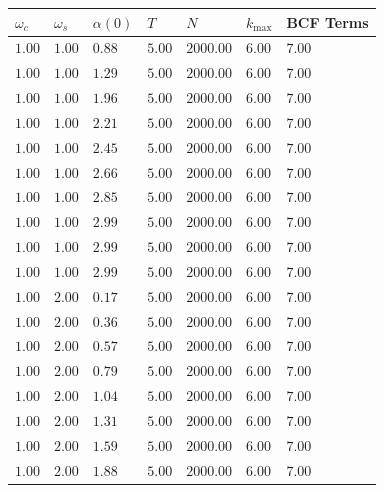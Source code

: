 \begin{longtable}[c]{lllllll}
  \toprule
   $ω_c$   & $ω_s$   & $α(0)$   & $T$    & $N$       & $k_{\mathrm{max}}$   & BCF Terms   \\
  \midrule
   $1.00$  & $1.00$  & $0.88$   & $5.00$ & $2000.00$ & $6.00$               & $7.00$      \\
   $1.00$  & $1.00$  & $1.29$   & $5.00$ & $2000.00$ & $6.00$               & $7.00$      \\
   $1.00$  & $1.00$  & $1.96$   & $5.00$ & $2000.00$ & $6.00$               & $7.00$      \\
   $1.00$  & $1.00$  & $2.21$   & $5.00$ & $2000.00$ & $6.00$               & $7.00$      \\
   $1.00$  & $1.00$  & $2.45$   & $5.00$ & $2000.00$ & $6.00$               & $7.00$      \\
   $1.00$  & $1.00$  & $2.66$   & $5.00$ & $2000.00$ & $6.00$               & $7.00$      \\
   $1.00$  & $1.00$  & $2.85$   & $5.00$ & $2000.00$ & $6.00$               & $7.00$      \\
   $1.00$  & $1.00$  & $2.99$   & $5.00$ & $2000.00$ & $6.00$               & $7.00$      \\
   $1.00$  & $1.00$  & $2.99$   & $5.00$ & $2000.00$ & $6.00$               & $7.00$      \\
   $1.00$  & $1.00$  & $2.99$   & $5.00$ & $2000.00$ & $6.00$               & $7.00$      \\
   $1.00$  & $2.00$  & $0.17$   & $5.00$ & $2000.00$ & $6.00$               & $7.00$      \\
   $1.00$  & $2.00$  & $0.36$   & $5.00$ & $2000.00$ & $6.00$               & $7.00$      \\
   $1.00$  & $2.00$  & $0.57$   & $5.00$ & $2000.00$ & $6.00$               & $7.00$      \\
   $1.00$  & $2.00$  & $0.79$   & $5.00$ & $2000.00$ & $6.00$               & $7.00$      \\
   $1.00$  & $2.00$  & $1.04$   & $5.00$ & $2000.00$ & $6.00$               & $7.00$      \\
   $1.00$  & $2.00$  & $1.31$   & $5.00$ & $2000.00$ & $6.00$               & $7.00$      \\
   $1.00$  & $2.00$  & $1.59$   & $5.00$ & $2000.00$ & $6.00$               & $7.00$      \\
   $1.00$  & $2.00$  & $1.88$   & $5.00$ & $2000.00$ & $6.00$               & $7.00$      \\

\end{longtable}

